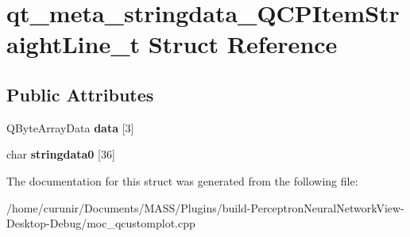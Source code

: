 \hypertarget{structqt__meta__stringdata___q_c_p_item_straight_line__t}{}\section{qt\+\_\+meta\+\_\+stringdata\+\_\+\+Q\+C\+P\+Item\+Straight\+Line\+\_\+t Struct Reference}
\label{structqt__meta__stringdata___q_c_p_item_straight_line__t}
\subsection*{Public Attributes}
\begin{DoxyCompactItemize}
\item 
Q\+Byte\+Array\+Data {\bfseries data} \mbox{[}3\mbox{]}\hypertarget{structqt__meta__stringdata___q_c_p_item_straight_line__t_a1b24e360df4ab7c0917a94969f909ba0}{}\label{structqt__meta__stringdata___q_c_p_item_straight_line__t_a1b24e360df4ab7c0917a94969f909ba0}

\item 
char {\bfseries stringdata0} \mbox{[}36\mbox{]}\hypertarget{structqt__meta__stringdata___q_c_p_item_straight_line__t_a0e2c6dce44cbc1e13041b33cd138f25d}{}\label{structqt__meta__stringdata___q_c_p_item_straight_line__t_a0e2c6dce44cbc1e13041b33cd138f25d}

\end{DoxyCompactItemize}


The documentation for this struct was generated from the following file\+:\begin{DoxyCompactItemize}
\item 
/home/curunir/\+Documents/\+M\+A\+S\+S/\+Plugins/build-\/\+Perceptron\+Neural\+Network\+View-\/\+Desktop-\/\+Debug/moc\+\_\+qcustomplot.\+cpp\end{DoxyCompactItemize}
